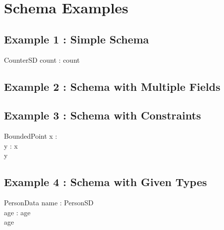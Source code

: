 \documentclass[a4paper,10pt,fleqn]{article}
\begin{document}
\section*{Schema Examples}

\subsection*{Example 1 : Simple Schema}

\begin{schema}{CounterSD}
count : \nat
\where
count 
\end{schema}

\subsection*{Example 2 : Schema with Multiple Fields}


\subsection*{Example 3 : Schema with Constraints}

\begin{schema}{BoundedPoint}
x : \nat \\
y : \nat
\where
x  \\
y 
\end{schema}

\subsection*{Example 4 : Schema with Given Types}

\begin{zed}
[PersonSD]
\end{zed}

\begin{schema}{PersonData}
name : PersonSD \\
age : \nat
\where
age  \\
age 
\end{schema}
\end{document}
